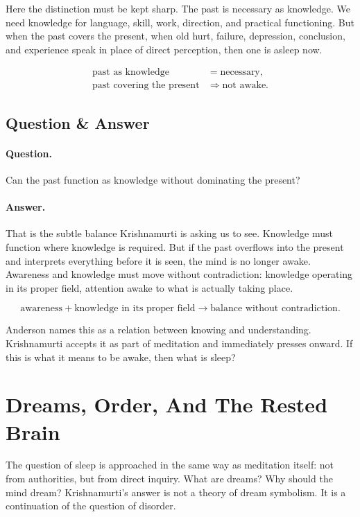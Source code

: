 Here the distinction must be kept sharp. The past is necessary as knowledge. We need knowledge for language, skill, work, direction, and practical functioning. But when the past covers the present, when old hurt, failure, depression, conclusion, and experience speak in place of direct perception, then one is asleep now.

\begin{align}
\text{past as knowledge} &= \text{necessary},\\
\text{past covering the present} &\Rightarrow \text{not awake}.
\end{align}

\subsection{Question \& Answer}

\paragraph{Question.}
Can the past function as knowledge without dominating the present?

\paragraph{Answer.}
That is the subtle balance Krishnamurti is asking us to see. Knowledge must function where knowledge is required. But if the past overflows into the present and interprets everything before it is seen, the mind is no longer awake. Awareness and knowledge must move without contradiction: knowledge operating in its proper field, attention awake to what is actually taking place.

\begin{equation}
\text{awareness} + \text{knowledge in its proper field}
\longrightarrow
\text{balance without contradiction}.
\end{equation}

Anderson names this as a relation between knowing and understanding. Krishnamurti accepts it as part of meditation and immediately presses onward. If this is what it means to be awake, then what is sleep?

\section{Dreams, Order, And The Rested Brain}

The question of sleep is approached in the same way as meditation itself: not from authorities, but from direct inquiry. What are dreams? Why should the mind dream? Krishnamurti's answer is not a theory of dream symbolism. It is a continuation of the question of disorder.

